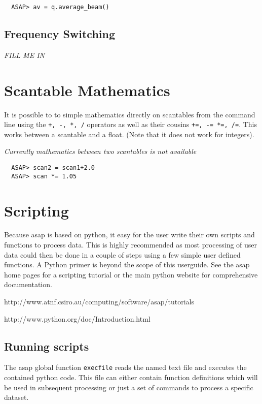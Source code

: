 \documentclass[11pt]{article}
\newcommand{\cmd}[1]{{\tt #1}}
\begin{document}
\begin{verbatim}
  ASAP> av = q.average_beam()
\end{verbatim}

\subsection{Frequency Switching}

{\em FILL ME IN}

\section{Scantable Mathematics}

It is possible to to simple mathematics
directly on scantables from the command line using the \cmd{+, -, *,
/} operators as well as their cousins \cmd{+=, -= *=, /=}. This works
between a scantable and a float. (Note that it does
not work for integers).

{\em Currently mathematics between two scantables is not available }

\begin{verbatim}
  ASAP> scan2 = scan1+2.0
  ASAP> scan *= 1.05
\end{verbatim}

\section{Scripting}

Because asap is based on python, it easy for the user
write their own scripts and functions to process data. This is highly
recommended as most processing of user data could then be done in a
couple of steps using a few simple user defined functions. A Python
primer is beyond the scope of this userguide. See the asap home pages
for a scripting tutorial or the main python website for comprehensive
documentation.

\hspace{1cm} http://www.atnf.csiro.au/computing/software/asap/tutorials

\hspace{1cm} http://www.python.org/doc/Introduction.html

\subsection{Running scripts}

The asap global function \cmd{execfile} reads the named text file and
executes the contained python code. This file can either contain
function definitions which will be used in subsequent processing or
just a set of commands to process a specific dataset.
\end{document}
